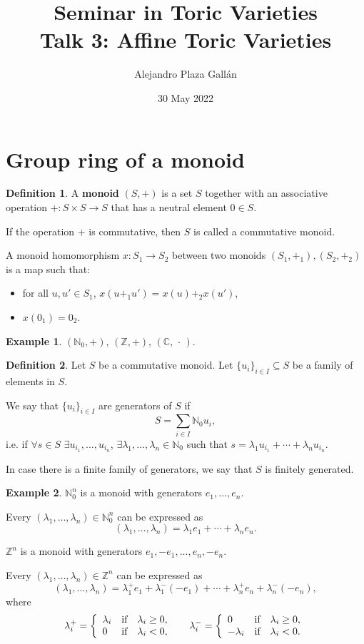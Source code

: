 \documentclass[12pt]{article}
\title{\Huge{Seminar in Toric Varieties}\\\vspace{5mm}\Large{Talk 3: Affine Toric Varieties}}
\author{Alejandro Plaza Gall\'{a}n}
\date{30 May 2022}
\theoremstyle{definition}
\newtheorem*{definition}{Definition}
\newtheorem*{example}{Example}
\begin{document}
\maketitle

\section{Group ring of a monoid}
\begin{definition}
A \textbf{monoid} $(S,+)$ is a set $S$ together with an associative operation $+:S\times S\rightarrow S$ that has a neutral element $0\in S$.

If the operation $+$ is commutative, then $S$ is called a commutative monoid.

A monoid homomorphism $x:S_1\rightarrow S_2$ between two monoids $(S_1,+_1),(S_2,+_2)$ is a map such that:
\begin{itemize}
\item for all $u,u'\in S_1$, $x(u+_1u')=x(u)+_2x(u')$,
\item $x(0_1)=0_2$.
\end{itemize}
\end{definition}

\begin{example}
$(\mathbb{N}_0,+)$, $(\mathbb{Z},+)$, $(\mathbb{C},\,\cdot\,)$.
\end{example}

\begin{definition}
Let $S$ be a commutative monoid. Let $\{u_i\}_{i\in I}\subseteq S$ be a family of elements in $S$.

We say that $\{u_i\}_{i\in I}$ are generators of $S$ if
\[S=\sum_{i\in I}\mathbb{N}_0u_i,\]
i.e. if $\forall s\in S$ $\exists u_{i_1},\ldots,u_{i_n}$, $\exists\lambda_1,\ldots,\lambda_n\in\mathbb{N}_0$ such that $s=\lambda_1u_{i_1}+\cdots+\lambda_nu_{i_n}$.

In case there is a finite family of generators, we say that $S$ is finitely generated.
\end{definition}

\begin{example}
$\mathbb{N}_0^n$ is a monoid with generators $e_1,\ldots,e_n$.

Every $(\lambda_1,\ldots,\lambda_n)\in\mathbb{N}_0^n$ can be expressed as
\[(\lambda_1,\ldots,\lambda_n)=\lambda_1e_1+\cdots+\lambda_ne_n.\]

$\mathbb{Z}^n$ is a monoid with generators $e_1,-e_1,\ldots,e_n,-e_n$.

Every $(\lambda_1,\ldots,\lambda_n)\in\mathbb{Z}^n$ can be expressed as
\[(\lambda_1,\ldots,\lambda_n)=\lambda_1^+e_1+\lambda_1^-(-e_1)+\cdots+\lambda_n^+e_n+\lambda_n^-(-e_n),\]
where
\[\lambda_i^+=\left\{\begin{array}{lll}\lambda_i&\text{if}&\lambda_i\geq0,\\0&\text{if}&\lambda_i<0,\end{array}\right.\hspace{5mm}\lambda_i^-=\left\{\begin{array}{lll}0&\text{if}&\lambda_i\geq0,\\-\lambda_i&\text{if}&\lambda_i<0.\end{array}\right.\]
\end{example}
\end{document}
